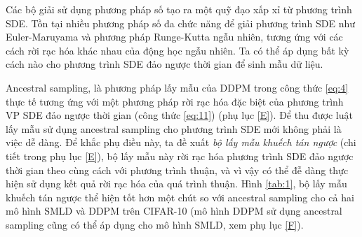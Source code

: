 \documentclass{article} %
\begin{document}
\begin{table}[h!]
    \centering
    \caption{So sánh các bộ giải phương trình SDE đảo ngược thời gian khác nhau trên tập CIFAR-10.
    Vùng tối màu thu được với cùng cách tính toán (số các hàm điểm số).
    Trung bình và độ lệch tiêu chuẩn được đưa ra trên 5 lần chạy.
    "P1000" hoặc "P2000": bộ lấy mẫu mà chỉ dự đoán sử dụng 1000 hoặc 2000 bước.
    "C2000": bộ lấy mẫu chỉ hiệu chỉnh sử dụng 2000 bước.
    "PC1000": Bộ lấy mẫu dự đoán hiệu chỉnh sử dụng 1000 bước dự đoán và 1000 bước hiệu chỉnh.}
    \label{tab:1}
\end{table}

Các bộ giải sử dụng phương pháp số tạo ra một quỹ đạo xấp xỉ từ phương trình SDE.
Tồn tại nhiều phương pháp số đa chức năng để giải phương trình SDE như Euler-Maruyama và phương pháp Runge-Kutta ngẫu nhiên, tương ứng với các cách rời rạc hóa khác nhau của động học ngẫu nhiên.
Ta có thể áp dụng bất kỳ cách nào cho phương trình SDE đảo ngược thời gian để sinh mẫu dữ liệu.

Ancestral sampling, là phương pháp lấy mẫu của DDPM trong công thức \ref{eq:4} thực tế tương ứng với một phương pháp rời rạc hóa đặc biệt của phương trình VP SDE đảo ngược thời gian (công thức \ref{eq:11}) (phụ lục \ref{E}).
Để thu được luật lấy mẫu sử dụng ancestral sampling cho phương trình SDE mới không phải là việc dễ dàng.
Để khắc phụ điều này, ta đề xuất \textit{bộ lấy mẫu khuếch tán ngược} (chi tiết trong phụ lục \ref{E}), bộ lấy mẫu này rời rạc hóa phương trình SDE đảo ngược thời gian theo cùng cách với phương trình thuận, và vì vậy có thể đễ dàng thực hiện sử dụng kết quả rời rạc hóa của quá trình thuận.
Hình \ref{tab:1}, bộ lấy mẫu khuếch tán ngược thể hiện tốt hơn một chút so với ancestral sampling cho cả hai mô hình SMLD và DDPM trên CIFAR-10 (mô hình DDPM sử dụng ancestral sampling cũng có thể áp dụng cho mô hình SMLD, xem phụ lục \ref{F}).
\end{document}
